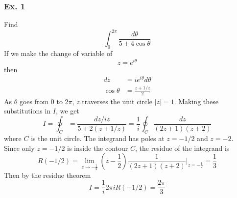 \documentclass[../../../main.tex]{subfiles}
\begin{document}
\subsubsection{Ex. 1} Find \begin{equation*}
    \int_{0}^{2\pi} \dfrac{d\theta}{5+4\cos \theta}
\end{equation*}
If we make the change of variable of 
\begin{equation*}
    z = e^{i\theta}
\end{equation*}
then 
\begin{align*}
    dz &= ie^{i\theta} d\theta\\
    \cos \theta&=\frac{z+1/z}{2}
\end{align*}
As $\theta$ goes from $0$ to $2\pi$, $z$ traverses the unit circle $|z| = 1$. Making these substitutions in $I$, we get
\begin{equation*}
    I=\oint_C =\frac{dz/iz}{5+2(z+1/z)}=\frac{1}{i}\oint_C\frac{dz}{(2z + 1)(z + 2)}
\end{equation*}
where $C$ is the unit circle. The integrand has poles at $z = -1/2$ and $ z = -2$. Since only $z = -1/2$ is inside the contour $C$, the residue of the integrand is 
\begin{equation*}
    R(-1/2)=\lim_{z\rightarrow -\frac{1}{2}}(z-\frac{1}{2})\frac{1}{(2z + 1)(z + 2)}\bigg|_{z=-\frac{1}{2}}=\frac{1}{3}
\end{equation*}
Then by the residue theorem
\begin{equation*}
    I=\frac{1}{i}2\pi i R(-1/2)=\frac{2\pi}{3}
\end{equation*}
\end{document}
